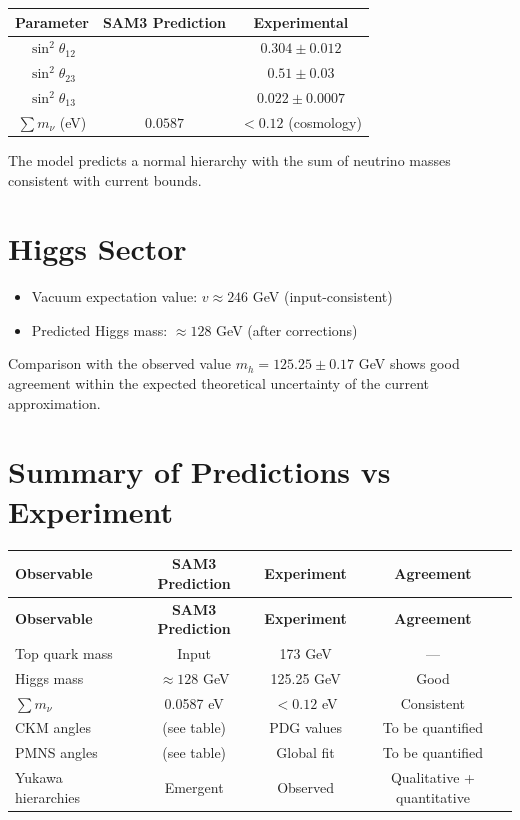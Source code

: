 \documentclass[11pt,a4paper]{article}
\begin{document}
\begin{center}
\begin{tabular}{c|c|c}
\hline
\textbf{Parameter} & \textbf{SAM3 Prediction} & \textbf{Experimental} \\
\hline
\(\sin^2\theta_{12}\) & & \(0.304 \pm 0.012\) \\
\(\sin^2\theta_{23}\) & & \(0.51 \pm 0.03\) \\
\(\sin^2\theta_{13}\) & & \(0.022 \pm 0.0007\) \\
\(\sum m_\nu\) (eV) & \(0.0587\) & \(< 0.12\) (cosmology) \\
\hline
\end{tabular}
\end{center}

The model predicts a normal hierarchy with the sum of neutrino masses consistent with current bounds.

\section{Higgs Sector}

\begin{itemize}
    \item Vacuum expectation value: \(v \approx 246\) GeV (input-consistent)
    \item Predicted Higgs mass: \(\approx 128\) GeV (after corrections)
\end{itemize}

Comparison with the observed value \(m_h = 125.25 \pm 0.17\) GeV shows good agreement within the expected theoretical uncertainty of the current approximation.

\section{Summary of Predictions vs Experiment}

\begin{center}
\begin{longtable}{l c c c}
\toprule
\textbf{Observable} & \textbf{SAM3 Prediction} & \textbf{Experiment} & \textbf{Agreement} \\
\midrule
\endfirsthead
\toprule
\textbf{Observable} & \textbf{SAM3 Prediction} & \textbf{Experiment} & \textbf{Agreement} \\
\midrule
\endhead
\bottomrule
\endfoot
Top quark mass & Input & 173 GeV & — \\
Higgs mass & \(\approx 128\) GeV & 125.25 GeV & Good \\
\(\sum m_\nu\) & 0.0587 eV & \(< 0.12\) eV & Consistent \\
CKM angles & (see table) & PDG values & To be quantified \\
PMNS angles & (see table) & Global fit & To be quantified \\
Yukawa hierarchies & Emergent & Observed & Qualitative + quantitative \\
\bottomrule
\end{longtable}
\end{center}
\end{document}
